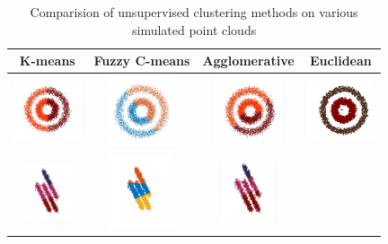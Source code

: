 \documentclass[12pt]{drexelthesis}
\begin{document}
 \begin{table}[!ht]
     \centering
           \caption[Comparison of Unsupervised clustering methods]{\centering Comparision of unsupervised clustering methods on various simulated point clouds}
     \begin{tabular}{ | c | c | c | c | }
     \hline
      K-means & Fuzzy C-means & Agglomerative & Euclidean \\ 
      \hline
      		\includegraphics[width=2cm]{2d-cluster-tests/k-means/concentric.jpg}
      & 
      		\includegraphics[trim={0 1cm 0 1cm},clip, width=2cm]{2d-cluster-tests/fcm/concentric.jpg}
      & 
      		\includegraphics[width=2cm]{2d-cluster-tests/agglomerative/concentric.jpg}
      &


      		\includegraphics[width=2cm]{2d-cluster-tests/euclidean-distance/concentric.jpg}
      \\ \hline
      
            \includegraphics[width=1.5cm]{2d-cluster-tests/k-means/lines.jpg}
      & 
             \includegraphics[trim={0 1cm 0 0.5cm},clip,width=1.9cm]{2d-cluster-tests/fcm/lines.jpg}    
      & 
             \includegraphics[trim={0 1cm 0 0cm},clip,width=1.5cm]{2d-cluster-tests/agglomerative/lines.jpg}    



\end{tabular}
\end{table}
\end{document}
